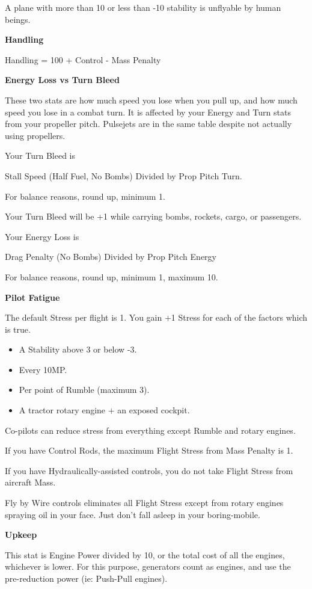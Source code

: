 \documentclass{article}
\begin{document}
A plane with more than 10 or less than -10 stability is unflyable
by human beings.

\textbf{Handling}

Handling = 100 + Control - Mass Penalty

\textbf{Energy Loss vs Turn Bleed}

These two stats are how much speed you lose when you pull up, and
how much speed you lose in a combat turn. It is affected by your Energy
and Turn stats from your propeller pitch. Pulsejets are in the same
table despite not actually using propellers.

Your Turn Bleed is

Stall Speed (Half Fuel, No Bombs) Divided by Prop Pitch Turn.

For balance reasons, round up, minimum 1.

Your Turn Bleed will be +1 while carrying bombs, rockets, cargo,
or passengers.

Your Energy Loss is

Drag Penalty (No Bombs) Divided by Prop Pitch Energy

For balance reasons, round up, minimum 1, maximum 10.

\textbf{Pilot Fatigue}

The default Stress per flight is 1. You gain +1 Stress for each
of the factors which is true.

\begin{itemize}
    \item A Stability above 3 or below -3.
    \item Every 10MP.
    \item Per point of Rumble (maximum 3).
    \item A tractor rotary engine + an exposed cockpit.
\end{itemize}

Co-pilots can reduce stress from everything except Rumble and
rotary engines.

If you have Control Rods, the maximum Flight Stress from Mass
Penalty is 1.

If you have Hydraulically-assisted controls, you do not take
Flight Stress from aircraft Mass.

Fly by Wire controls eliminates all Flight Stress except from
rotary engines spraying oil in your face. Just don't fall asleep in your
boring-mobile.

\textbf{Upkeep}

This stat is Engine Power divided by 10, or the total cost of all
the engines, whichever is lower.  For this purpose, generators count
as engines, and use the pre-reduction power (ie: Push-Pull engines).
\end{document}
